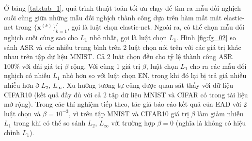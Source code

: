 Ở bảng \ref{tab:tab_1}, quá trình thuật toán tối ưu chạy để tìm ra mẫu đối nghịch cuối cùng giữa những mẫu đối nghịch thành công dựa trên hàm mất mát elastic-net trong $\{\mathbf{x}^{(k)}\}^I_{k=1}$, gọi là luật chọn elastic-net. Ngoài ra, có thể chọn mẫu đối nghịch cuối cùng sao cho $L_1$ nhỏ nhất, gọi là luật chọn $L_1$. Hình \ref{fig:fg_02} so sánh ASR và các nhiễu trung bình trên 2 luật chọn nói trên với các giá trị  khác nhau trên tập dữ liệu MNIST. Cả 2 luật chọn đều cho tỷ lệ thành công ASR $100\%$ với dải giá trị $\beta$ rộng. Với cùng 1 giá trị $\beta$, luật chọn $L_1$ cho ra các mẫu đối nghịch có nhiễu $L_1$ nhỏ hơn so với luật chọn EN, trong khi đó lại bị trả giá nhiều nhiễu hơn ở $L_2$, $L_{\infty}$. Xu hướng tương tự cũng được quan sát thấy với dữ liệu CIFAR10 (kết quả đầy đủ với cả 2 tập dữ liệu MNIST và CIFAR có trong tài liệu mở rộng). Trong các thí nghiệm tiếp theo, tác giả báo cáo kết quả của EAD với 2 luật chọn và $\beta = 10^{-3}$, vì trên tập MNIST và CIFAR10 giá trị $\beta$ làm giảm nhiễu $L_1$ trong khi có thể so sánh $L_2$, $L_{\infty}$ với trường hợp $\beta = 0$ (nghĩa là không có hiệu chỉnh $L_1$).

